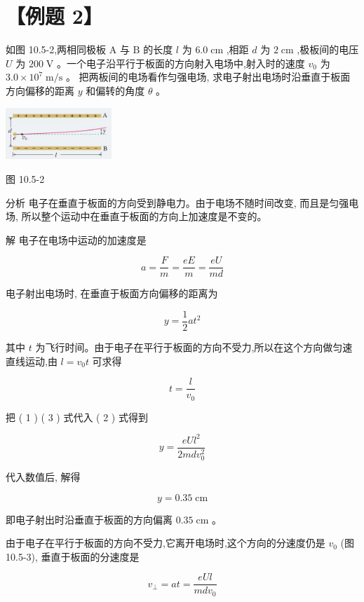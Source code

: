 \documentclass[10pt]{article}
\begin{document}
\section*{【例题 2】}

如图 10.5-2,两相同极板 \(\mathrm{A}\) 与 \(\mathrm{B}\) 的长度 \(l\) 为 \({6.0}\mathrm{\;{cm}}\) ,相距 \(d\) 为 \(2\mathrm{\;{cm}}\) ,极板间的电压 \(U\) 为 \({200}\mathrm{\;V}\) 。一个电子沿平行于板面的方向射入电场中,射入时的速度 \({v}_{0}\) 为 \({3.0} \times {10}^{7}\mathrm{\;m}/\mathrm{s}\) 。 把两板间的电场看作匀强电场, 求电子射出电场时沿垂直于板面方向偏移的距离 \(y\) 和偏转的角度 \(\theta\) 。

\begin{center}
\includegraphics[max width=0.3\textwidth]{images/01911d5f-8e38-70c0-b5b8-2b399bd115b6_51_212461.jpg}
\end{center}

图 10.5-2

分析 电子在垂直于板面的方向受到静电力。由于电场不随时间改变, 而且是匀强电场, 所以整个运动中在垂直于板面的方向上加速度是不变的。

解 电子在电场中运动的加速度是

\[
a = \frac{F}{m} = \frac{eE}{m} = \frac{eU}{md} \tag{1}
\]

电子射出电场时, 在垂直于板面方向偏移的距离为

\[
y = \frac{1}{2}a{t}^{2} \tag{（2）}
\]

其中 \(t\) 为飞行时间。由于电子在平行于板面的方向不受力,所以在这个方向做匀速直线运动,由 \(l = {v}_{0}t\) 可求得

\[
t = \frac{l}{{v}_{0}} \tag{3}
\]

把 ( 1 ) ( 3 ) 式代入 ( 2 ) 式得到

\[
y = \frac{{eU}{l}^{2}}{{2md}{v}_{0}^{2}}
\]

代入数值后, 解得

\[
y = {0.35}\mathrm{\;{cm}}
\]

即电子射出时沿垂直于板面的方向偏离 \({0.35}\mathrm{\;{cm}}\) 。

由于电子在平行于板面的方向不受力,它离开电场时,这个方向的分速度仍是 \({v}_{0}\) (图 10.5-3), 垂直于板面的分速度是

\[
{v}_{ \bot } = {at} = \frac{eUl}{{md}{v}_{0}}
\]
\end{document}
